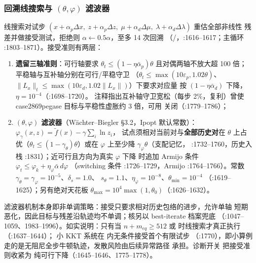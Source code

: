 \subsubsection*{回溯线搜索与 $(\theta,\varphi)$ 滤波器}
线搜索对试步 $(x+\alpha_p\Delta x,\;z+\alpha_p\Delta z,\;
\mu+\alpha_d\Delta\mu,\;\lambda+\alpha_d\Delta\lambda)$ 重估全部非线性
残差并做接受测试，拒绝则 $\alpha\leftarrow0.5\alpha$，至多 14 次回溯
（/，:1616--1617；主循环
 :1803--1871）。接受准则有两层：
\begin{enumerate}
  \item \textbf{遗留三轴准则}：可行轴要求
        $\theta_t\le(1-\eta\bar\alpha_p)\theta$ 且对偶两轴不放大超 100 倍；
        平稳轴与互补轴分别在可行/平稳守卫
        （$\theta_t\le\max(10\varepsilon_p,1.02\theta)$、
        $\|L_x\|_t\le\max(10\varepsilon_d,1.02\|L_x\|)$）下要求对应量
        按 $(1-\eta\bar\alpha_d)$ 下降，$\eta=10^{-4}$（:1698--1720）。
        注释指出互补轴守卫宽松（每步 2\%，复利）曾使 case2869pegase
        目标与平稳性虚胀约 3 倍，可用 
        关闭（:1779--1786）；
  \item \textbf{$(\theta,\varphi)$ 滤波器}（Wächter--Biegler §3.2，Ipopt
        默认常数）：$\varphi_\gamma(x,z)=\tilde f(x)-\gamma\sum_i\ln z_i$，
        试点须相对当前对与\textbf{全部历史对}在
        $\theta$ 上占优（$\theta_t\le(1-\gamma_\theta)\theta$）或在
        $\varphi$ 上至少降 $\gamma_\varphi\theta$（支配记忆，
        :1732--1760，历史入栈 :1831）；近可行且方向为真实 $\varphi$ 下降
        时追加 Armijo 条件
        $\varphi_t\le\varphi_k+\eta_\varphi\bar\alpha\, d\varphi$
        （switching 条件 :1726--1729，Armijo :1764--1766）。常数
        $\gamma_\theta=\gamma_\varphi=10^{-5}$、$\delta_s=1.0$、
        $s_\theta=1.1$、$\eta_\varphi=10^{-8}$、$\theta_{\min}=10^{-4}$
        （:1619--1625）；另有绝对天花板
        $\theta_{\max}=10^{4}\max(1,\theta_0)$（:1626--1632）。
\end{enumerate}
滤波器机制本身即非单调策略：接受只要求相对历史包络的进步，允许单轴
短期恶化，因此目标与残差沿轨迹均不单调；核另以 best-iterate 档案兜底
（:1047--1059、1983--1996）。如实说明：只有当 $n+m_{eq}\ge512$ 或
 时线搜索才真正执行（:1637--1644）；
小 KKT 系统在  内无条件接受首个有限试步
（:1770），即小算例走的是无阻尼全步牛顿轨迹，发散风险由后续异常路径
承担。诊断开关  把接受准则收紧为
纯可行下降（:1645--1646、1775--1778）。

